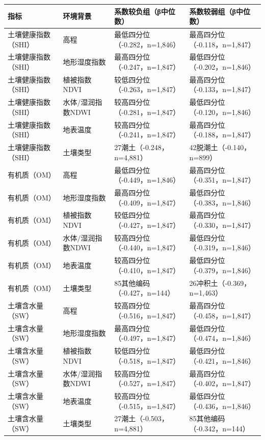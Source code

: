 \documentclass[
  a4paper,
  12pt]{ctexart}
\begin{document}
\begin{longtable}[]{@{}llll@{}}
\toprule
指标 & 环境背景 & 系数较负组（β中位数） & 系数较弱组（β中位数） \\
\midrule
\endhead
土壤健康指数（SHI） & 高程 & 最低四分位（-0.282，n=1,846） &
最高四分位（-0.118，n=1,847） \\
土壤健康指数（SHI） & 地形湿度指数 & 最高四分位（-0.247，n=1,847） &
最低四分位（-0.202，n=1,846） \\
土壤健康指数（SHI） & 植被指数NDVI & 较低四分位（-0.263，n=1,847） &
最高四分位（-0.133，n=1,847） \\
土壤健康指数（SHI） & 水体/湿润指数NDWI & 较高四分位（-0.281，n=1,847）
& 最低四分位（-0.120，n=1,846） \\
土壤健康指数（SHI） & 地表温度 & 较高四分位（-0.241，n=1,847） &
最高四分位（-0.188，n=1,847） \\
土壤健康指数（SHI） & 土壤类型 & 27潮土（-0.248，n=4,881） &
42脱潮土（-0.140，n=899） \\
有机质（OM） & 高程 & 最低四分位（-0.449，n=1,846） &
最高四分位（-0.351，n=1,847） \\
有机质（OM） & 地形湿度指数 & 最高四分位（-0.409，n=1,847） &
最低四分位（-0.383，n=1,846） \\
有机质（OM） & 植被指数NDVI & 较低四分位（-0.427，n=1,847） &
最高四分位（-0.330，n=1,847） \\
有机质（OM） & 水体/湿润指数NDWI & 较高四分位（-0.440，n=1,847） &
最低四分位（-0.319，n=1,846） \\
有机质（OM） & 地表温度 & 较高四分位（-0.410，n=1,847） &
最低四分位（-0.379，n=1,846） \\
有机质（OM） & 土壤类型 & 85其他编码（-0.427，n=144） &
26冲积土（-0.369，n=1,463） \\
土壤含水量（SW） & 高程 & 较高四分位（-0.516，n=1,847） &
最高四分位（-0.458，n=1,847） \\
土壤含水量（SW） & 地形湿度指数 & 最高四分位（-0.497，n=1,847） &
最低四分位（-0.474，n=1,846） \\
土壤含水量（SW） & 植被指数NDVI & 较低四分位（-0.518，n=1,847） &
最低四分位（-0.421，n=1,846） \\
土壤含水量（SW） & 水体/湿润指数NDWI & 较高四分位（-0.527，n=1,847） &
最高四分位（-0.402，n=1,847） \\
土壤含水量（SW） & 地表温度 & 较高四分位（-0.515，n=1,847） &
最低四分位（-0.436，n=1,846） \\
土壤含水量（SW） & 土壤类型 & 27潮土（-0.503，n=4,881） &
85其他编码（-0.342，n=144） \\
\bottomrule
\end{longtable}
\end{document}
